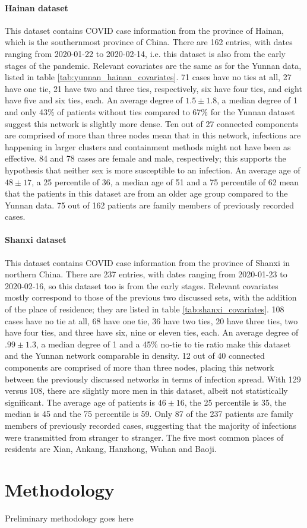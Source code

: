 \documentclass{article}
\begin{document}
	\paragraph{Hainan dataset} This dataset contains COVID case information from the province of Hainan, which is the southernmost province of China. There are 162 entries, with dates ranging from 2020-01-22 to 2020-02-14, i.e. this dataset is also from the early stages of the pandemic. Relevant covariates are the same as for the Yunnan data, listed in table \ref{tab:yunnan_hainan_covariates}. 71 cases have no ties at all, 27 have one tie, 21 have two and three ties, respectively, six have four ties, and eight have five and six ties, each. An average degree of $1.5\pm1.8$, a median degree of 1 and only 43\% of patients without ties compared to 67\% for the Yunnan dataset suggest this network is slightly more dense. Ten out of 27 connected components are comprised of more than three nodes mean that in this network, infections are happening in larger clusters and containment methods might not have been as effective. 84 and 78 cases are female and male, respectively; this supports the hypothesis that neither sex is more susceptible to an infection. An average age of $48\pm17$, a 25 percentile of 36, a median age of 51 and a 75 percentile of 62 mean that the patients in this dataset are from an older age group compared to the Yunnan data. 75 out of 162 patients are family members of previously recorded cases.
	
	\paragraph{Shanxi dataset} This dataset contains COVID case information from the province of Shanxi in northern China. There are 237 entries, with dates ranging from 2020-01-23 to 2020-02-16, so this dataset too is from the early stages. Relevant covariates mostly correspond to those of the previous two discussed sets, with the addition of the place of residence; they are listed in table \ref{tab:shanxi_covariates}. 108 cases have no tie at all, 68 have one tie, 36 have two ties, 20 have three ties, two have four ties, and three have six, nine or eleven ties, each. An average degree of $.99\pm1.3$, a median degree of 1 and a 45\% no-tie to tie ratio make this dataset and the Yunnan network comparable in density. 12 out of 40 connected components are comprised of more than three nodes, placing this network between the previously discussed networks in terms of infection spread. With 129 versus 108, there are slightly more men in this dataset, albeit not statistically significant. The average age of patients is $46\pm16$, the 25 percentile is 35, the median is 45 and the 75 percentile is 59. Only 87 of the 237 patients are family members of previously recorded cases, suggesting that the majority of infections were transmitted from stranger to stranger. The five most common places of residents are Xian, Ankang, Hanzhong, Wuhan and Baoji.
		
	\section{Methodology}
	Preliminary methodology goes here
\end{document}
